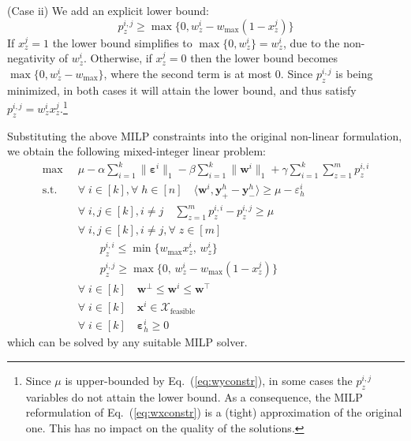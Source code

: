 \documentclass{article}
\renewcommand\[{\begin{equation}}
\renewcommand\]{\end{equation}}
\newcommand{\calvar}[1]{\ensuremath{\mathcal{#1}}}
\newcommand{\calX}{\calvar{X}}
\newcommand{\vecvar}[1]{\ensuremath{\boldsymbol{#1}}}
\newcommand{\vw}{\vecvar{w}}
\newcommand{\vx}{\vecvar{x}}
\newcommand{\vy}{\vecvar{y}}
\newcommand{\veps}{\vecvar{\varepsilon}}
\begin{document}
(Case ii) We add an explicit lower bound:
%
$$ p^{i,j}_z \ge \max \{ 0, w^{i}_z - w_\text{max}(1 - x^{j}_z) \} $$
%
If $x^j_z = 1$ the lower bound simplifies to
$\max \{ 0, w^{i}_z \} = w^{i}_z$, due to the non-negativity of
$w^i_z$. Otherwise, if $x^j_z = 0$ then the lower bound becomes
$\max \{ 0, w^{i}_z - w_\text{max} \}$, where the second term is at
most $0$. Since $p^{i,j}_z$ is being minimized, in both cases it will
attain the lower bound, and thus satisfy
$p^{i,j}_z = w^i_z x^j_z$.\footnote{Since $\mu$ is upper-bounded by
Eq.~(\ref{eq:wyconstr}), in some cases the $p^{i,j}_z$ variables do not attain
the lower bound. As a consequence, the MILP reformulation of
Eq.~(\ref{eq:wxconstr}) is a (tight) approximation of the original one. This
has no impact on the quality of the solutions.}

Substituting the above MILP constraints into the original non-linear
formulation, we obtain the following mixed-integer linear problem:
%
{\footnotesize
\begin{align}
    \max
        & \;\; \mu - \alpha \sum_{i=1}^k \| \veps^{i} \|_1 - \beta \sum_{i=1}^k \| \vw^{i} \|_1 + \gamma \sum_{i=1}^k \sum_{z=1}^m p^{i,i}_z
        \nonumber
    \\
    \text{s.t.}
        & \;\; \forall \; i \in [k], \forall \; h \in [n] \quad \langle \vw^{i}, \vy^{h}_+ - \vy^{h}_- \rangle \ge \mu - \varepsilon^{i}_h \nonumber
    \\
        & \;\; \forall \; i, j \in [k], i \neq j \quad \sum_{z=1}^m p^{i,i}_z - p^{i,j}_z \ge \mu
    \\
        & \;\; \forall \; i, j \in [k], i \neq j, \forall \; z \in [m] \nonumber
    \\
        & \;\; \qquad p^{i,i}_z \le \min \{ w_\text{max} x^{i}_z, \, w^{i}_z \} \label{eq:volatile1}
    \\
        & \;\; \qquad p^{i,j}_z \ge \max \{ 0, \, w^{i}_z - w_\text{max}(1 - x^{j}_z) \} \label{eq:volatile2}
    \\
        & \;\; \forall \; i \in [k] \quad \vw^\bot \le \vw^{i} \le \vw^\top \label{eq:wbounds2}
    \\
        & \;\; \forall \; i \in [k] \quad \vx^{i} \in \calX_{\text{feasible}} \nonumber
    \\
        & \;\; \forall \; i \in [k] \quad \veps^{i}_h \ge 0 \nonumber
\end{align}
}
%
which can be solved by any suitable MILP solver.
\end{document}
